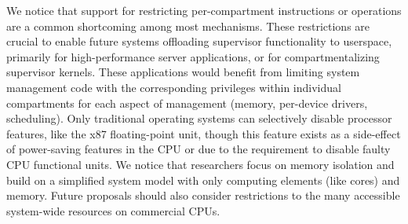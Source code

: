 We notice that support for restricting per-compartment instructions or
operations are a common shortcoming among most mechanisms.
These restrictions are crucial to enable future systems offloading supervisor
functionality to userspace, primarily for high-performance server
applications, or for compartmentalizing supervisor kernels.
These applications would benefit from limiting system management code with
the corresponding privileges within individual compartments for each
aspect of management (memory, per-device drivers, scheduling).
Only traditional operating systems can selectively disable processor features,
like the x87 floating-point unit, though this feature exists as a side-effect
of power-saving features in the CPU or due to the requirement to disable
faulty CPU functional units.
We notice that researchers focus on memory isolation and build on a simplified
system model with only computing elements (like cores) and memory.
Future proposals should also consider restrictions to the many accessible 
system-wide resources on commercial CPUs.

